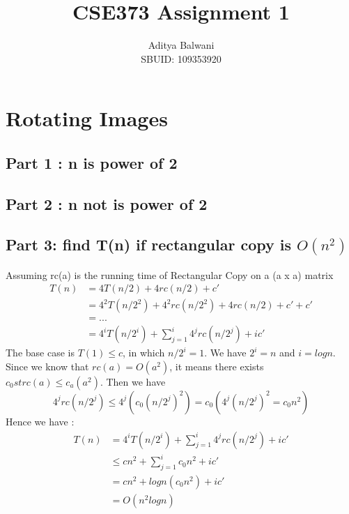 \documentclass{article}
\title{\textbf{CSE373 Assignment 1}}
\author{Aditya Balwani\\SBUID: 109353920}
\begin{document}
\maketitle
\section{Rotating Images}
	\subsection{Part 1 : n is power of 2}
	

	\subsection{Part 2 : n not is power of 2}
    

    \subsection{Part 3: find T(n) if rectangular copy is $O(n^2)$}
    Assuming rc(a) is the running time of Rectangular Copy on a (a x a) matrix
        \begin{align*}
            T(n) &= 4T(n/2) + 4rc(n/2) + c'\\
            &= 4^2T(n/2^2) + 4^2rc(n/2^2) + 4rc(n/2) + c' + c'\\
            &= ... \\
            &= 4^iT(n/2^i) + \sum_{j=1}^{i}4^jrc(n/2^j) + ic'
        \end{align*}
        The base case is $T(1) \leq c$, in which $n/2^i = 1$. We have $2^i = n$ and $i = log n$. Since we know that $rc(a) = O(a^2)$, it means there exists $c_0 st rc(a) \leq c_a(a^2)$. Then we have
        \[4^jrc(n/2^j) \leq 4^j(c_0(n/2^j)^2) = c_0(4^j(n/2^j)^2 = c_0n^2)\]
        Hence we have :
        \begin{align*}
            T(n) &= 4^iT(n/2^i) + \sum_{j=1}^{i}4^jrc(n/2^j) + ic'\\
            &\leq cn^2 + \sum_{j=1}^{i}c_0n^2 + ic'\\
            &= cn^2 + log n(c_0n^2) + ic'\\
            &=O(n^2log n)\\
        \end{align*}
\end{document}
